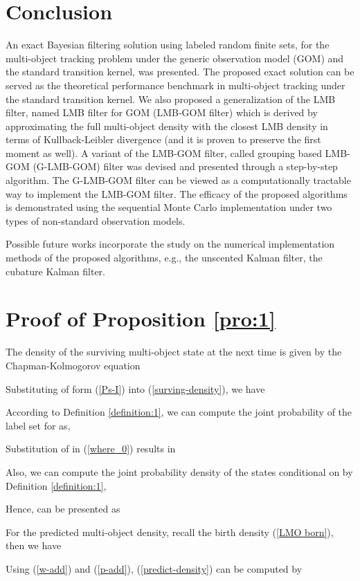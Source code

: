 \documentclass[journal]{IEEEtran}
\begin{document}
{\section{Conclusion}\label{chp:8}
An exact  Bayesian filtering solution using labeled random finite sets, for the multi-object tracking problem under the generic observation model (GOM) and the  standard transition kernel, was presented. 
The proposed exact solution can be served as the theoretical performance benchmark in multi-object tracking under the standard transition kernel.  We also proposed a generalization of the  LMB filter, named LMB filter for GOM (LMB-GOM filter) which is derived by approximating the full multi-object density with the closest  LMB density  in terms of Kullback-Leibler divergence (and it is proven to preserve the first moment  as well). A variant of the LMB-GOM filter, called grouping based LMB-GOM (G-LMB-GOM) filter was devised    and presented through a step-by-step algorithm.  The G-LMB-GOM filter can be viewed as a computationally tractable way to implement the LMB-GOM filter. The efficacy of the proposed algorithms is demonstrated using the sequential Monte Carlo implementation  under  two types of   non-standard observation models. 

Possible future works  incorporate the study on the numerical implementation methods of the proposed algorithms, e.g., the unscented  Kalman filter, the cubature Kalman filter.
\appendices
\section{Proof of Proposition \ref{pro:1}}
The density of the surviving multi-object state at the next time is given by the Chapman-Kolmogorov equation

Substituting    of form (\ref{Ps-I}) into (\ref{surving-density}), we have

According to Definition \ref{definition:1}, we can compute the joint probability of the label set  for  as,

Substitution of  in (\ref{where_0}) results in

Also, we can compute the joint probability density of the states  conditional on  by Definition \ref{definition:1}, 

Hence,   can be presented as



For the predicted multi-object density, recall the birth density (\ref{LMO born}), then we have

Using (\ref{w-add}) and (\ref{p-add}), (\ref{predict-density}) can be computed by

}
\end{document}
